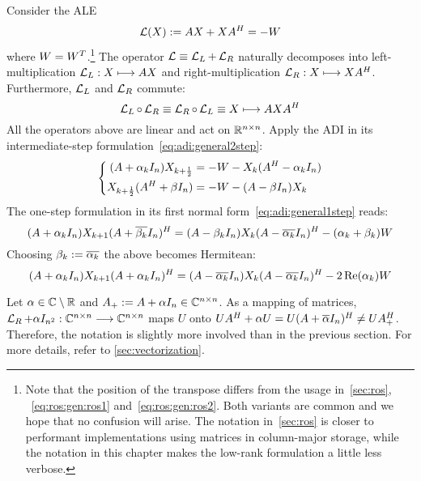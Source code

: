 Consider the \ac{ALE}
\begin{equation}
\label{eq:adi:ale}
  \operatorname{\mathcal L}(X) := AX + XA^H = -W
\end{equation}
where $W = W^T$.\footnote{%
  Note that the position of the transpose differs from the usage in~\autoref{sec:ros},
  \eg~\eqref{eq:ros:gen:ros1} and~\eqref{eq:ros:gen:ros2}.
  Both variants are common and we hope that no confusion will arise.
  The notation in~\autoref{sec:ros} is closer to performant implementations using matrices in column-major storage,
  while the notation in this chapter makes the low-rank formulation a little less verbose.
}
The \Lyapunov operator $\operatorname{\mathcal L} \equiv \operatorname{\mathcal L}_L + \operatorname{\mathcal L}_R$ naturally decomposes into
left-multiplication $\operatorname{\mathcal L}_L : X \longmapsto AX$ and
right-multiplication $\operatorname{\mathcal L}_R : X \longmapsto XA^H$.
Furthermore, $\operatorname{\mathcal L}_L$ and $\operatorname{\mathcal L}_R$ commute:
\begin{equation}
  \operatorname{\mathcal L}_L \circ \operatorname{\mathcal L}_R \equiv \operatorname{\mathcal L}_R \circ \operatorname{\mathcal L}_L \equiv X \longmapsto AXA^H
\end{equation}
All the operators above are linear and act on $\mathbb{R}^{n\times n}$.
Apply the \ac{ADI} in its intermediate-step formulation~\eqref{eq:adi:general2step}:
\begin{equation}
  \left\{
  \begin{aligned}
    (A + \alpha_k I_n) X_{k+\frac{1}{2}} &= -W - X_k (A^H - \alpha_k I_n) \\
    X_{k+\frac{1}{2}} (A^H + \beta I_n) &= -W - (A - \beta I_n) X_k
  \end{aligned}
  \right.
\end{equation}
The one-step formulation in its first normal form~\eqref{eq:adi:general1step} reads:
\begin{equation}
  (A + \alpha_k I_n)
  X_{k+1}
  (A + \conj{\beta_k} I_n)^\HT
  =
  (A - \beta_k I_n)
  X_k
  (A - \conj{\alpha_k} I_n)^\HT
  - (\alpha_k + \beta_k)
  W
\end{equation}
Choosing $\beta_k := \conj{\alpha_k}$
the above becomes Hermitean:
\begin{equation}
\label{eq:adi:ale1step}
  (A + \alpha_k I_n)
  X_{k+1}
  (A + \alpha_k I_n)^\HT
  =
  (A - \conj{\alpha_k} I_n)
  X_k
  (A - \conj{\alpha_k} I_n)^\HT
  - 2\Re(\alpha_k)
  W
\end{equation}

\begin{remark}
  Let $\alpha\in\mathbb{C}\setminus\mathbb{R}$ and $A_+ := A+\alpha I_n \in\mathbb{C}^{n\times n}$.
  As a mapping of matrices,
  $\operatorname{\mathcal L}_R + \alpha I_{n^2} : \mathbb{C}^{n\times n} \longrightarrow \mathbb{C}^{n\times n}$ maps $U$ onto
  $
    U A^\HT + \alpha U =
    U(A+\conj{\alpha} I_n)^\HT \neq
    U A_+^\HT
  $.
  Therefore, the notation is slightly more involved than in the previous section.
  For more details, refer to \autoref{sec:vectorization}.
\end{remark}

